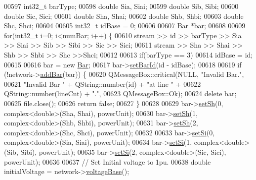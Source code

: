 \begin{DoxyCode}
00597   int32\_t barType;
00598   \textcolor{keywordtype}{double} Sia, Siai;
00599   \textcolor{keywordtype}{double} Sib, Sibi;
00600   \textcolor{keywordtype}{double} Sic, Sici;
00601   \textcolor{keywordtype}{double} Sha, Shai;
00602   \textcolor{keywordtype}{double} Shb, Shbi;
00603   \textcolor{keywordtype}{double} Shc, Shci;
00604 
00605   int32\_t idBase = 0;
00606 
00607   \hyperlink{class_bar}{Bar} *bar;
00608 
00609   \textcolor{keywordflow}{for}(int32\_t i=0; i<numBar; i++) \{
00610     stream >> \textcolor{keywordtype}{id} >> barType >> Sia >> Siai >> Sib >> Sibi >> Sic >> Sici;
00611     stream >> Sha >> Shai >> Shb >> Shbi >> Shc >>Shci;
00612 
00613     \textcolor{keywordflow}{if}(barType == 3)
00614       idBase = id;
00615 
00616     bar = \textcolor{keyword}{new} \hyperlink{class_bar}{Bar};
00617     bar->\hyperlink{group___models_gae3cf341a76cc4589fe3203d0a3ed2ac0}{setBarId}(\textcolor{keywordtype}{id} - idBase);
00618 
00619     \textcolor{keywordflow}{if} (!network->\hyperlink{group___models_ga8c5dfef0216731246f7411e1a5fbee01}{addBar}(bar)) \{
00620       QMessageBox::critical(NULL, \textcolor{stringliteral}{"Invalid Bar."},
00621                             \textcolor{stringliteral}{"Invalid Bar "} + QString::number(\textcolor{keywordtype}{id}) + \textcolor{stringliteral}{"at line "} +
00622                             QString::number(lineCnt) + \textcolor{stringliteral}{"."},
00623                             QMessageBox::Ok);
00624       \textcolor{keyword}{delete} bar;
00625       file.close();
00626       \textcolor{keywordflow}{return} \textcolor{keyword}{false};
00627     \}
00628 
00629     bar->\hyperlink{group___models_gafd91c7f15566b9d5a68a197efeaeaf26}{setSh}(0, complex<double>(Sha, Shai), powerUnit);
00630     bar->\hyperlink{group___models_gafd91c7f15566b9d5a68a197efeaeaf26}{setSh}(1, complex<double>(Shb, Shbi), powerUnit);
00631     bar->\hyperlink{group___models_gafd91c7f15566b9d5a68a197efeaeaf26}{setSh}(2, complex<double>(Shc, Shci), powerUnit);
00632 
00633     bar->\hyperlink{group___models_ga85e2a9b8a281900333fd65d1b532acfd}{setSi}(0, complex<double>(Sia, Siai), powerUnit);
00634     bar->\hyperlink{group___models_ga85e2a9b8a281900333fd65d1b532acfd}{setSi}(1, complex<double>(Sib, Sibi), powerUnit);
00635     bar->\hyperlink{group___models_ga85e2a9b8a281900333fd65d1b532acfd}{setSi}(2, complex<double>(Sic, Sici), powerUnit);
00636 
00637     \textcolor{comment}{// Set Initial voltage to 1pu.}
00638     \textcolor{keywordtype}{double} initialVoltage = network->\hyperlink{group___models_ga88cd2506aaf0b19513e41f00608093e0}{voltageBase}();

\end{DoxyCode}
